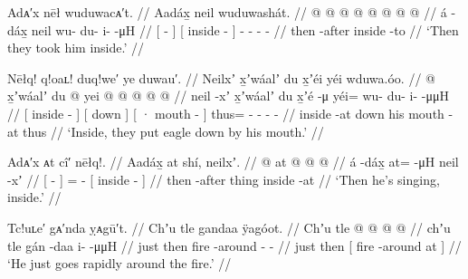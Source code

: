 \ex\label{ex:100-177-took-inside}%
%
\begingl
	\glpreamble	Adᴀ′x nēł wuduwacᴀ′t. //
	\glpreamble	Aadáx̱ neil wuduwashát. //
	\gla	{}  @ {} {} 
		{}  @ {} {} 
		 @ {} @ {} @ {} @ {} @ {} @ {} //
	\glb	{} á -dáx̱ {} 
		{} neil {} {}
		wu- du- i-  -μH //
	\glc	{}[  - {}]
		{}[ inside - {}]
		- - -  - //
	\gld	{} then -after {}
		{} inside -to {}
		 {} {} {} {} {} {} //
	\glft	‘Then they took him inside.’
		//
\endgl
\xe

\ex\label{ex:100-178-eagle-down}%
%
\begingl
	\glpreamble	Nēłq! q!oaʟ! duq!we′ ye duwau′. //
	\glpreamble	Neilxʼ x̱ʼwáalʼ du x̱ʼéi yéi wduwa.óo. //
	\gla	{}  @ {} {} 
		{} x̱ʼwáalʼ {} 
		{} du  @ {} {} 
		yei @  @ {} @ {} @ {} @ {} //
	\glb	{} neil -xʼ {} 
		{} x̱ʼwáalʼ {} 
		{} du x̱ʼé -μ {} 
		yéi= wu- du- i-  -μμH //
	\glc	{}[ inside - {}]
		{}[ down {}]
		{}[ · mouth - {}]
		thus= - - -  - //
	\gld	{} inside -at {}
		{} down {}
		{} his mouth -at {}
		thus  {} {} {} {} //
	\glft	‘Inside, they put eagle down by his mouth.’
		//
\endgl
\xe

\ex\label{ex:100-179-singing-inside}%
%
\begingl
	\glpreamble	Adᴀ′x ᴀt cî′ nēłq!. //
	\glpreamble	Aadáx̱ at shí, neilxʼ. //
	\gla	{}  @ {} {} 
		at @  @ {}
		{}  @ {} {} //
	\glb	{} á -dáx̱ {}
		at=  -μH
		{} neil -xʼ {} //
	\glc	{}[  - {}]
		=  -\hspace{2em}
		{}[ inside - {}] //
	\gld	{} then -after {}
		thing  {}
		{} inside -at {} //
	\glft	‘Then he’s singing, inside.’
		//
\endgl
\xe

\ex\label{ex:100-180-around-fire}%
%
\begingl
	\glpreamble	Tc!uʟe′ gᴀ′nda ỵᴀgū′t. //
	\glpreamble	Chʼu tle gandaa ÿagóot. //
	\gla	Chʼu tle
		{}  @ {} @ {} {} 
		 @ {} @ {} //
	\glb	chʼu tle
		{} gán -daa {} {}
		i-  -μμH //
	\glc	just then
		{} fire -around \· {}
		-  - //
	\gld	just then
		{}[ fire -around \·at {}]
		 {} {} //
	\glft	‘He just goes rapidly around the fire.’
		//
\endgl
\xe

